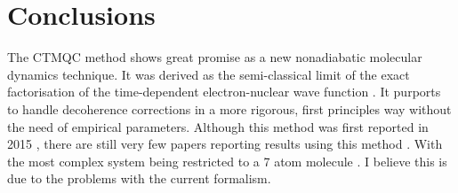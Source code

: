\section{Conclusions}
The CTMQC method shows great promise as a new nonadiabatic molecular dynamics technique. It was derived as the semi-classical limit of the exact factorisation of the time-dependent electron-nuclear wave function \cite{abedi_exact_2010, agostini_semiclassical_2015}. It purports to handle decoherence corrections in a more rigorous, first principles way without the need of empirical parameters. Although this method was first reported in 2015 \cite{agostini_semiclassical_2015}, there are still very few papers reporting results using this method \cite{min_ab_2017, gossel_coupled-trajectory_2018,agostini_semiclassical_2015}. With the most complex system being restricted to a 7 atom molecule \cite{min_ab_2017}. I believe this is due to the problems with the current formalism.



